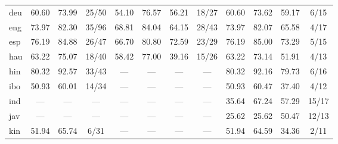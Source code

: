 \begin{table*}[h]
{\begin{tabular}{l|ccc|cccc|cccc}
            deu               & 60.60                        & 73.99                        & 25/50                       & 54.10          & 76.57               & 56.21            & 18/27         & 60.60          & 73.62               & 59.17            & 6/15          \\
            eng               & 73.97                        & 82.30                        & 35/96                       & 68.81          & 84.04               & 64.15            & 28/43         & 73.97          & 82.07               & 65.58            & 4/17          \\
            esp               & 76.19                        & 84.88                        & 26/47                       & 66.70          & 80.80               & 72.59            & 23/29         & 76.19          & 85.00               & 73.29            & 5/15          \\
            hau               & 63.22                        & 75.07                        & 18/40                       & 58.42          & 77.00               & 39.16            & 15/26         & 63.22          & 73.14               & 51.91            & 4/13          \\
            hin               & 80.32                        & 92.57                        & 33/43                       & —              & —                   & —                & —             & 80.32          & 92.16               & 79.73            & 6/16          \\
            ibo               & 50.93                        & 60.01                        & 14/34                       & —              & —                   & —                & —             & 50.93          & 60.47               & 37.40            & 4/12          \\
            ind               & —                            & —                            & —                           & —              & —                   & —                & —             & 35.64          & 67.24               & 57.29            & 15/17         \\
            jav               & —                            & —                            & —                           & —              & —                   & —                & —             & 25.62          & 25.62               & 50.47            & 12/13         \\
            kin               & 51.94                        & 65.74                        & 6/31                        & —              & —                   & —                & —             & 51.94          & 64.59               & 34.36            & 2/11          \\

\end{tabular}}
\end{table*}
